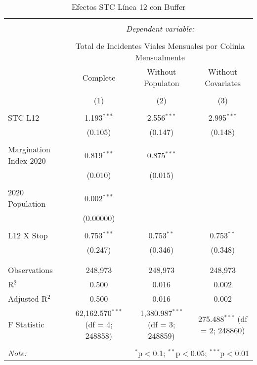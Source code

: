 
\begin{table}[!htbp] \centering 
  \caption{Efectos STC Línea 12 con Buffer} 
  \label{} 
\begin{tabular}{@{\extracolsep{5pt}}lccc} 
\\[-1.8ex]\hline 
\hline \\[-1.8ex] 
 & \multicolumn{3}{c}{\textit{Dependent variable:}} \\ 
\cline{2-4} 
\\[-1.8ex] & \multicolumn{3}{c}{Total de Incidentes Viales Mensuales por Colinia Mensualmente} \\ 
 & Complete & Without Populaton & Without Covariates \\ 
\\[-1.8ex] & (1) & (2) & (3)\\ 
\hline \\[-1.8ex] 
 STC L12 & 1.193$^{***}$ & 2.556$^{***}$ & 2.995$^{***}$ \\ 
  & (0.105) & (0.147) & (0.148) \\ 
  & & & \\ 
 Margination Index 2020 & 0.819$^{***}$ & 0.875$^{***}$ &  \\ 
  & (0.010) & (0.015) &  \\ 
  & & & \\ 
 2020 Population & 0.002$^{***}$ &  &  \\ 
  & (0.00000) &  &  \\ 
  & & & \\ 
 L12 X Stop & 0.753$^{***}$ & 0.753$^{**}$ & 0.753$^{**}$ \\ 
  & (0.247) & (0.346) & (0.348) \\ 
  & & & \\ 
\hline \\[-1.8ex] 
Observations & 248,973 & 248,973 & 248,973 \\ 
R$^{2}$ & 0.500 & 0.016 & 0.002 \\ 
Adjusted R$^{2}$ & 0.500 & 0.016 & 0.002 \\ 
F Statistic & 62,162.570$^{***}$ (df = 4; 248858) & 1,380.987$^{***}$ (df = 3; 248859) & 275.488$^{***}$ (df = 2; 248860) \\ 
\hline 
\hline \\[-1.8ex] 
\textit{Note:}  & \multicolumn{3}{r}{$^{*}$p$<$0.1; $^{**}$p$<$0.05; $^{***}$p$<$0.01} \\ 
\end{tabular} 
\end{table} 
